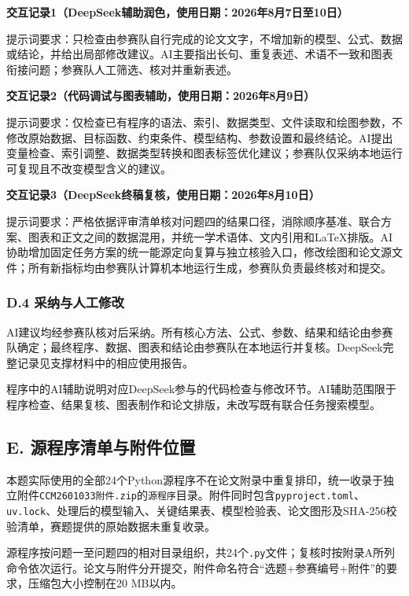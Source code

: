 \noindent\textbf{交互记录1（DeepSeek辅助润色，使用日期：2026年8月7日至10日）}

提示词要求：只检查由参赛队自行完成的论文文字，不增加新的模型、公式、数据或结论，并给出局部修改建议。AI主要指出长句、重复表述、术语不一致和图表衔接问题；参赛队人工筛选、核对并重新表述。

\noindent\textbf{交互记录2（代码调试与图表辅助，使用日期：2026年8月9日）}

提示词要求：仅检查已有程序的语法、索引、数据类型、文件读取和绘图参数，不修改原始数据、目标函数、约束条件、模型结构、参数设置和最终结论。AI提出变量检查、索引调整、数据类型转换和图表标签优化建议；参赛队仅采纳本地运行可复现且不改变模型含义的建议。

\noindent\textbf{交互记录3（DeepSeek终稿复核，使用日期：2026年8月10日）}

提示词要求：严格依据评审清单核对问题四的结果口径，消除顺序基准、联合方案、图表和正文之间的数据混用，并统一学术语体、文内引用和LaTeX排版。AI协助增加固定任务方案的统一能源定向复算与独立核验入口，修改绘图和论文源文件；所有新指标均由参赛队计算机本地运行生成，参赛队负责最终核对和提交。

\subsubsection*{D.4 采纳与人工修改}

AI建议均经参赛队核对后采纳。所有核心方法、公式、参数、结果和结论由参赛队确定；最终程序、数据、图表和结论由参赛队在本地运行并复核。DeepSeek完整记录见支撑材料中的相应使用报告。

程序中的AI辅助说明对应DeepSeek参与的代码检查与修改环节。AI辅助范围限于程序检查、结果复核、图表制作和论文排版，未改写既有联合任务搜索模型。

\subsection*{E. 源程序清单与附件位置}

本题实际使用的全部24个Python源程序不在论文附录中重复排印，统一收录于独立附件\texttt{CCM2601033附件.zip}的\texttt{源程序}目录。附件同时包含\texttt{pyproject.toml}、\texttt{uv.lock}、处理后的模型输入、关键结果表、模型检验表、论文图形及SHA-256校验清单，赛题提供的原始数据未重复收录。

源程序按问题一至问题四的相对目录组织，共24个\texttt{.py}文件；复核时按附录A所列命令依次运行。论文与附件分开提交，附件命名符合“选题+参赛编号+附件”的要求，压缩包大小控制在20 MB以内。
